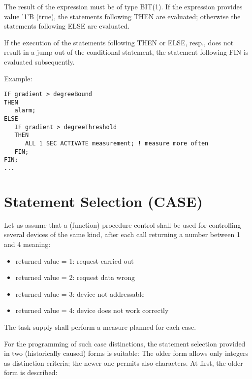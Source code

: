 \begin{grammarframe}
\end{grammarframe}

The result of the expression must be of type BIT(1). If the expression
provides value '1'B (true), the statements following THEN are evaluated;
otherwise the statements following ELSE are evaluated.

If the execution of the statements following THEN or ELSE, resp., does
not result in a jump out of the conditional statement, the statement
following FIN is evaluated subsequently.

Example:

\begin{lstlisting}
IF gradient > degreeBound
THEN
   alarm;
ELSE
   IF gradient > degreeThreshold 
   THEN 
      ALL 1 SEC ACTIVATE measurement; ! measure more often
   FIN;
FIN;
...
\end{lstlisting}

\section{Statement Selection (CASE)}  %
\label{sec_case}

Let us assume that a (function) procedure control shall be used for
controlling several devices of the same kind, after each call returning
a number between 1 and 4 meaning:
\begin{itemize}
\item returned value = 1: request carried out
\item returned value = 2: request data wrong
\item returned value = 3: device not addressable
\item returned value = 4: device does not work correctly
\end{itemize}

The task supply shall perform a measure planned for each case.

For the programming of such case distinctions, the statement selection
provided in two (historically caused) forms is suitable: The older form
allows only integers as distinction criteria; the newer one permits also
characters. At first, the older form is described:

\begin{grammarframe}
\end{grammarframe}

